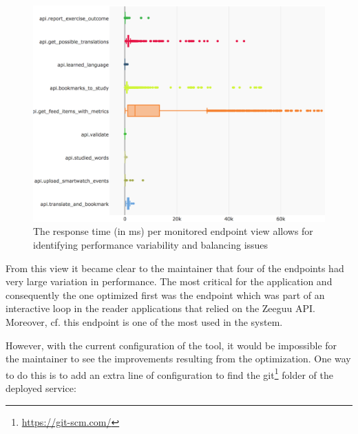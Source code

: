 \documentclass[conference]{IEEEtran}
\begin{document}

  \begin{figure}[!ht]
    \centering
    \includegraphics[width=0.95\linewidth]{endpoint_performance_}
    \caption{The response time (in ms) per monitored endpoint view allows for identifying performance variability and balancing issues}
    \label{fig:ep}
  \end{figure}

  From this view it became clear to the maintainer that four of the endpoints had very large variation in performance.   The most critical for the application and consequently the one optimized first was the \epTranslations endpoint which was part of an interactive loop in the reader applications that relied on the Zeeguu API. Moreover, cf.  this endpoint is one of the most used in the system.


  \niceseparator

  However, with the current configuration of the tool, it would be impossible for the maintainer to see the improvements resulting from the optimization. One way to do this is to add an extra line of configuration to \tool find the git\footnote{\url{https://git-scm.com/}} folder of the deployed service: 

%
%
%
    
\end{document}
